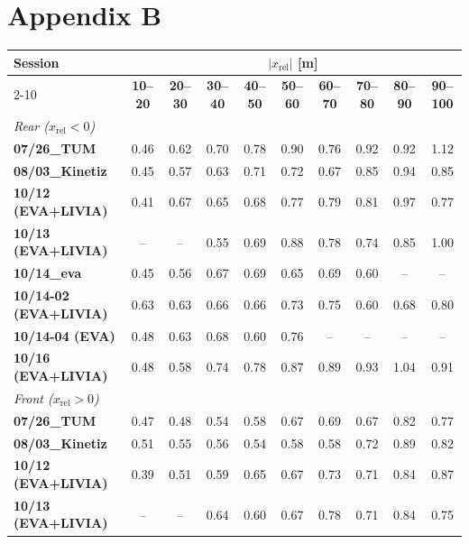 \chapter*{Appendix B}
\label{app:lidar}

\begin{table}[H]
\centering
\setlength{\tabcolsep}{3pt}\footnotesize
\begin{tabular}{|lccccccccc|}
\hline
\rowcolor{bluepoli!40} \textbf{Session} &\multicolumn{9}{c|}{\textbf{$|x_{\mathrm{rel}}|$ [m]}} \\
\cline{2-10}
 \rowcolor{bluepoli!40} & \textbf{10--20} & \textbf{20--30} & \textbf{30--40} & \textbf{40--50} & \textbf{50--60} & \textbf{60--70} & \textbf{70--80} & \textbf{80--90} & \textbf{90--100} \\
\hline\hline
\multicolumn{10}{|l|}{\textit{Rear ($x_{\mathrm{rel}}<0$)}} \\
\textbf{07/26\_TUM} & 0.46 & 0.62 & 0.70 & 0.78 & 0.90 & 0.76 & 0.92 & 0.92 & 1.12 \\
\textbf{08/03\_Kinetiz} & 0.45 & 0.57 & 0.63 & 0.71 & 0.72 & 0.67 & 0.85 & 0.94 & 0.85 \\
\textbf{10/12 (EVA+LIVIA)} & 0.41 & 0.67 & 0.65 & 0.68 & 0.77 & 0.79 & 0.81 & 0.97 & 0.77 \\
\textbf{10/13 (EVA+LIVIA)} & -- & -- & 0.55 & 0.69 & 0.88 & 0.78 & 0.74 & 0.85 & 1.00 \\
\textbf{10/14\_eva} & 0.45 & 0.56 & 0.67 & 0.69 & 0.65 & 0.69 & 0.60 & -- & -- \\
\textbf{10/14-02 (EVA+LIVIA)} & 0.63 & 0.63 & 0.66 & 0.66 & 0.73 & 0.75 & 0.60 & 0.68 & 0.80 \\
\textbf{10/14-04 (EVA)} & 0.48 & 0.63 & 0.68 & 0.60 & 0.76 & -- & -- & -- & -- \\
\textbf{10/16 (EVA+LIVIA)} & 0.48 & 0.58 & 0.74 & 0.78 & 0.87 & 0.89 & 0.93 & 1.04 & 0.91 \\
\hline
\multicolumn{10}{|l|}{\textit{Front ($x_{\mathrm{rel}}>0$)}} \\
\textbf{07/26\_TUM} & 0.47 & 0.48 & 0.54 & 0.58 & 0.67 & 0.69 & 0.67 & 0.82 & 0.77 \\
\textbf{08/03\_Kinetiz} & 0.51 & 0.55 & 0.56 & 0.54 & 0.58 & 0.58 & 0.72 & 0.89 & 0.82 \\
\textbf{10/12 (EVA+LIVIA)} & 0.39 & 0.51 & 0.59 & 0.65 & 0.67 & 0.73 & 0.71 & 0.84 & 0.87 \\
\textbf{10/13 (EVA+LIVIA)} & -- & -- & 0.64 & 0.60 & 0.67 & 0.78 & 0.71 & 0.84 & 0.75 \\

\end{tabular}
\end{table}
